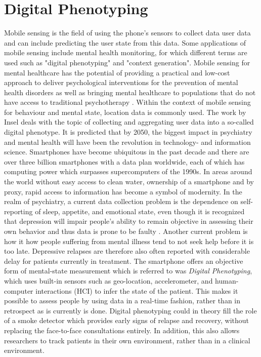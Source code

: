 \section{Digital Phenotyping}
Mobile sensing is the field of using the phone's sensors to collect data user data and can include predicting the user state from this data. Some applications of mobile sensing include mental health monitoring, for which different terms are used such as "digital phenotyping" and "context generation". Mobile sensing for mental healthcare has the potential of providing a practical and low-cost approach to deliver psychological interventions for the prevention of mental health disorders \cite{mobile-based-interventions} as well as bringing mental healthcare to populations that do not have access to traditional psychotherapy \cite{future-mental-health}. Within the context of mobile sensing for behaviour and mental state, location data is commonly used. The work by Insel \cite{digital_phenotyping} deals with the topic of collecting and aggregating user data into a so-called digital phenotype. It is predicted that by 2050, the biggest impact in psychiatry and mental health will have been the revolution in technology- and information science. Smartphones have become ubiquitous in the past decade and there are over three billion smartphones with a data plan worldwide, each of which has computing power which surpasses supercomputers of the 1990s. In areas around the world without easy access to clean water, ownership of a smartphone and by proxy, rapid access to information has become a symbol of modernity. In the realm of psychiatry, a current data collection problem is the dependence on self-reporting of sleep, appetite, and emotional state, even though it is recognized that depression will impair people's ability to remain objective in assessing their own behavior and thus data is prone to be faulty \cite{digital_phenotyping}. Another current problem is how it how people suffering from mental illness tend to not seek help before it is too late. Depressive relapses are therefore also often reported with considerable delay for patients currently in treatment. The smartphone offers an objective form of mental-state measurement which is referred to was \textit{Digital Phenotyping}, which uses built-in sensors such as geo-location, accelerometer, and human-computer interactions (HCI) to infer the state of the patient. This makes it possible to assess people by using data in a real-time fashion, rather than in retrospect as is currently is done. Digital phenotyping could in theory fill the role of a smoke detector which provides early signs of relapse and recovery, without replacing the face-to-face consultations entirely. In addition, this also allows researchers to track patients in their own environment, rather than in a clinical environment.

